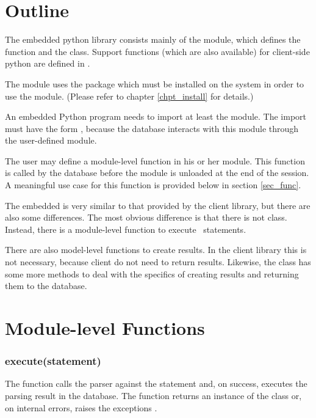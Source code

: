 \section{Outline}
The embedded python library consists mainly
of the  module, which defines
the  function and the  class.
Support functions (which are also available)
for client-side python are defined in
.

The module uses the package 
which must be installed on the system in order
to use the  module.
(Please refer to chapter
\ref{chpt_install} for details.)

An embedded Python program needs to import at least
the  module. The import must have
the form , because the database
interacts with this module through the user-defined
module.

The user may define a module-level function
 in his or her module.
This function is called by the database
before the module is unloaded at the end of
the session. A meaningful use case for this
function is provided below in section \ref{sec_func}.

The embedded  is very similar
to that provided by the client library,
but there are also some differences.
The most obvious difference is that
there is not  class.
Instead, there is a module-level function
to execute \sql\ statements.

There are also model-level functions
to create results. In the client library
this is not necessary, because client
do not need to return results.
Likewise, the  class
has some more methods to deal with
the specifics of creating results
and returning them to the database.


\section{Module-level Functions}

\subsubsection{execute(statement)}
The function calls the parser against the statement and, on success,
executes the parsing result in the database.
The function returns an instance of the  class
or, on internal errors, raises the exceptions .

